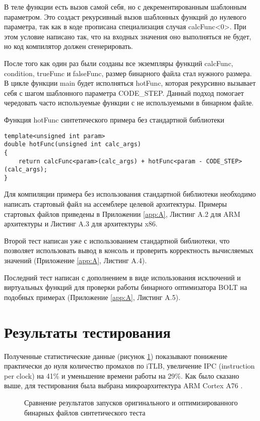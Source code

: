 В теле функции есть вызов самой себя, но с декрементированным шаблонным параметром. Это создаст рекурсивный вызов шаблонных функций до нулевого параметра, так как в коде прописана специализация случая calcFunc<0>. При этом условие написано так, что на входных значения оно выполняться не будет, но код компилятор должен сгенерировать.

После того как один раз были созданы все экземпляры функций calcFunc, condition, trueFunc и falseFunc, размер бинарного файла стал нужного размера. В цикле функции main будет исполняться hotFunc, которая рекурсивно вызывает себя с шагом шаблонного параметра CODE\_STEP. Данный подход помогает чередовать часто используемые функции с не используемыми в бинарном файле.

\begin{ListingEnv}[!h]
    \captiondelim{ }
    \caption{Функция hotFunc синтетического примера без стандартной библиотеки}\label{lst:hwbeauty}
    \begin{lstlisting}[language={[ISO]C++}]
template<unsigned int param>
double hotFunc(unsigned int calc_args)
{
    return calcFunc<param>(calc_args) + hotFunc<param - CODE_STEP>(calc_args);
}
    \end{lstlisting}
\end{ListingEnv}%

Для компиляции примера без использования стандартной библиотеки необходимо написать стартовый файл на ассемблере целевой архитектуры. Примеры стартовых файлов приведены в Приложении \cref{app:A}, Листинг A.2 для ARM архитектуры и Листинг A.3 для архитектуры x86.

Второй тест написан уже с использованием стандартной библиотеки, что позволяет использовать вывод в консоль и проверить корректность вычисляемых значений (Приложение \cref{app:A}, Листинг A.4).

Последний тест написан с дополнением в виде использования исключений и виртуальных функций для проверки работы бинарного оптимизатора BOLT на подобных примерах (Приложение \cref{app:A}, Листинг A.5).

\section{Результаты тестирования}\label{sec:ch2/sec6}
Полученные статистические данные (рисунок \cref{fig:SynRes}) показывают понижение практически до нуля количество промахов по iTLB, увеличение IPC (instruction per clock) на 41\% и уменьшение времени работы на 29\%. Как было сказано выше, для тестирования была выбрана микроархитектура ARM Cortex A76 \cite{vakbib1}.
\begin{figure}[!h]
    \centerfloat{
        \texttt{[image: 13]}
    }
    \caption{Сравнение результатов запусков оригинального и оптимизированного бинарных файлов синтетического теста}\label{fig:SynRes}
\end{figure}

